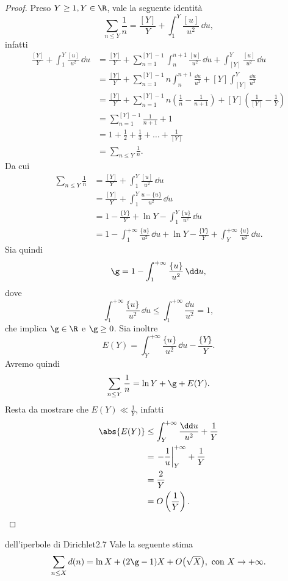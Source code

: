 \begin{proof}
	Preso \(Y\ge 1,Y\in \R\), vale la seguente identità
	\[
		\sum_{n\le Y}\frac{1}{n}=\frac{[Y]}{Y}+\int_1^Y \frac{[u]}{u^2}\,\dd u,
	\]
	infatti
	\[
		\begin{split}
			\frac{[Y]}{Y}+\int_1^Y \frac{[u]}{u^2}\,\dd u & =\frac{[Y]}{Y}+\sum_{n=1}^{[Y]-1}\int_n^{n+1}\frac{[u]}{u^2}\,\dd u+\int_{[Y]}^Y \frac{[u]}{u^2}\,\dd u\\
			& =\frac{[Y]}{Y}+\sum_{n=1}^{[Y]-1} n \int_n^{n+1}\frac{\dd u}{u^2}+ [Y]\int_{[Y]}^Y \frac{\dd u}{u^2}\\
			& =\frac{[Y]}{Y}+\sum_{n=1}^{[Y]-1}n\left(\frac{1}{n}-\frac{1}{n+1}\right)+[Y]\left(\frac{1}{[Y]}-\frac{1}{Y}\right)\\
			& =\sum_{n=1}^{[Y]-1}\frac{1}{n+1}+1\\
			& =1+\frac{1}{2}+\frac{1}{3}+\ldots+\frac{1}{[Y]}\\
			& =\sum_{n\le Y}\frac{1}{n}.
		\end{split}
	\]
	Da cui
	\[
		\begin{split}
			\sum_{n\le Y}\frac{1}{n} & =\frac{[Y]}{Y}+\int_1^Y \frac{[u]}{u^2}\,\dd u\\
			& =\frac{[Y]}{Y}+\int_1^Y \frac{u-\{u\}}{u^2}\,\dd u\\
			& =1-\frac{\{Y\}}{Y}+\ln Y-\int_1^Y \frac{\{u\}}{u^2}\,\dd u\\
			& =1-\int_1^{+\infty}\frac{\{u\}}{u^2}\,\dd u+\ln Y-\frac{\{Y\}}{Y}+\int_Y^{+\infty}\frac{\{u\}}{u^2}\,\dd u.
		\end{split}
	\]
	Sia quindi
	\[
		\g=1-\int_1^{+\infty}\frac{\{u\}}{u^2}\,\dd u,
	\]
	dove
	\[
		\int_1^{+\infty}\frac{\{u\}}{u^2}\,\dd u \le \int_1^{+\infty}\frac{\dd u}{u^2}=1,
	\]
	che implica \(\g\in \R\) e \(\g\ge 0\).
	Sia inoltre
	\[
		E(Y)=\int_Y^{+\infty}\frac{\{u\}}{u^2}\,\dd u-\frac{\{Y\}}{Y}.
	\]
	Avremo quindi
	\[
		\sum_{n\le Y}\frac{1}{n}=\ln Y+\g+E(Y).
	\]
	Resta da mostrare che \(E(Y)\ll \frac{1}{Y}\), infatti
	\[
		\begin{split}
			\abs{E(Y)} & \le \int_Y^{+\infty}\frac{\dd u}{u^2}+\frac{1}{Y}\\
			& =\left.-\frac{1}{u}\right|_Y^{+\infty}+\frac{1}{Y}\\
			& =\frac{2}{Y}\\
			& =O\left(\frac{1}{Y}\right).\qedhere
		\end{split}
	\]
\end{proof}

\begin{teor}{dell'iperbole di Dirichlet}{2.7}
	Vale la seguente stima
	\[
		\sum_{n\le X}d(n)=\ln X+(2\g-1)X+O\big(\sqrt{X}\big),\text{ con }X\to+\infty.
	\]
\end{teor}

